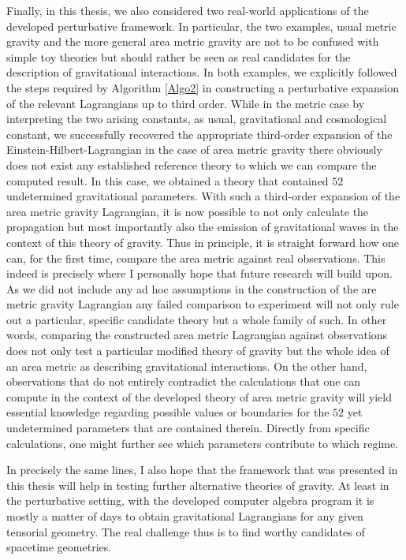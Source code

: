 Finally, in this thesis, we also considered two real-world applications of the developed perturbative framework. In particular, the two examples, usual metric gravity and the more general area metric gravity are not to be confused with simple toy theories but should rather be seen as real candidates for the description of gravitational interactions. In both examples, we explicitly followed the steps required by Algorithm \ref{Algo2} in constructing a perturbative expansion of the relevant Lagrangians up to third order. While in the metric case by interpreting the two arising constants, as usual, gravitational and cosmological constant, we successfully recovered the appropriate third-order expansion of the Einstein-Hilbert-Lagrangian in the case of area metric gravity there obviously does not exist any established reference theory to which we can compare the computed result. In this case, we obtained a theory that contained $52$ undetermined gravitational parameters. 
With such a third-order expansion of the area metric gravity Lagrangian, it is now possible to not only calculate the propagation but most importantly also the emission of gravitational waves in the context of this theory of gravity. Thus in principle, it is straight forward how one can, for the first time, compare the area metric against real observations. This indeed is precisely where I personally hope that future research will build upon. 
As we did not include any ad hoc assumptions in the construction of the are metric gravity Lagrangian any failed comparison to experiment will not only rule out a particular, specific candidate theory but a whole family of such. In other words, comparing the constructed area metric Lagrangian against observations does not only test a particular modified theory of gravity but the whole idea of an area metric as describing gravitational interactions. 
On the other hand, observations that do not entirely contradict the calculations that one can compute in the context of the developed theory of area metric gravity will yield essential knowledge regarding possible values or boundaries for the $52$ yet undetermined parameters that are contained therein. 
Directly from specific calculations, one might further see which parameters contribute to which regime. 

In precisely the same lines, I also hope that the framework that was presented in this thesis will help in testing further alternative theories of gravity. At least in the perturbative setting, with the developed computer algebra program it is mostly a matter of days to obtain gravitational Lagrangians for any given tensorial geometry. The real challenge thus is to find worthy candidates of spacetime geometries. 

